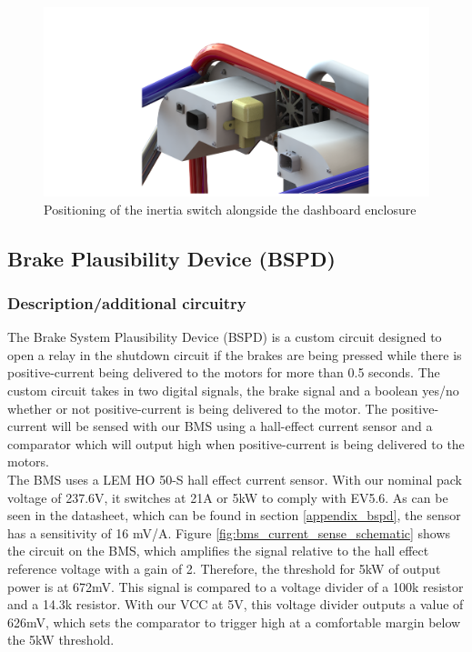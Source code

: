 \documentclass{article}
\begin{document}
  \begin{figure}[H]
  \centering
  \includegraphics[width = 0.9 \textwidth]{ImpactSensor3-1-17}
  \caption{Positioning of the inertia switch alongside the dashboard enclosure}
  \label{fig:inertia_switch_mount}
  \end{figure}


\subsection{Brake Plausibility Device (BSPD)}\label{brake_plausibility_device}
\subsubsection{Description/additional circuitry}

The Brake System Plausibility Device (BSPD) is a custom circuit designed to open a relay in the shutdown circuit if the brakes are being pressed while there is positive-current being delivered to the motors for more than 0.5 seconds. The custom circuit takes in two digital signals, the brake signal and a boolean yes/no whether or not positive-current is being delivered to the motor. The positive-current will be sensed with our BMS using a hall-effect current sensor and a comparator which will output high when positive-current is being delivered to the motors. \\

The BMS uses a LEM HO 50-S hall effect current sensor. With our nominal pack voltage of 237.6V, it switches at 21A or 5kW to comply with EV5.6. As can be seen in the datasheet, which can be found in section \ref{appendix_bspd}, the sensor has a sensitivity of 16 mV/A. Figure \ref{fig:bms_current_sense_schematic} shows the circuit on the BMS, which amplifies the signal relative to the hall effect reference voltage with a gain of 2. Therefore, the threshold for 5kW of output power is at 672mV. This signal is compared to a voltage divider of a 100k resistor and a 14.3k resistor. With our VCC at 5V, this voltage divider outputs a value of 626mV, which sets the comparator to trigger high at a comfortable margin below the 5kW threshold.\\
\end{document}
